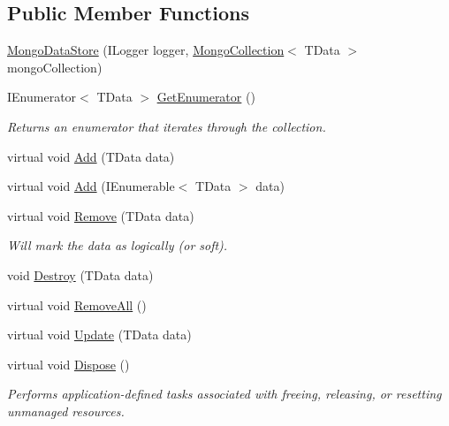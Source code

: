 \subsection*{Public Member Functions}
\begin{DoxyCompactItemize}
\item 
\hyperlink{classCqrs_1_1Mongo_1_1DataStores_1_1MongoDataStore_a39f738d53074a548e6932bacdc4a4e3a}{Mongo\+Data\+Store} (I\+Logger logger, \hyperlink{classCqrs_1_1Mongo_1_1DataStores_1_1MongoDataStore_aa183a8ce44ec16d755f1e4fbe5ec4b10}{Mongo\+Collection}$<$ T\+Data $>$ mongo\+Collection)
\item 
I\+Enumerator$<$ T\+Data $>$ \hyperlink{classCqrs_1_1Mongo_1_1DataStores_1_1MongoDataStore_a3eeaf3e59a540025ff2aa0f62b5dd465}{Get\+Enumerator} ()
\begin{DoxyCompactList}\small\item\em Returns an enumerator that iterates through the collection. \end{DoxyCompactList}\item 
virtual void \hyperlink{classCqrs_1_1Mongo_1_1DataStores_1_1MongoDataStore_a27bcfb40fe8203e09d320b2aa19fff3a}{Add} (T\+Data data)
\item 
virtual void \hyperlink{classCqrs_1_1Mongo_1_1DataStores_1_1MongoDataStore_a38c242b255dc17cf8d19470fdf5a99bf}{Add} (I\+Enumerable$<$ T\+Data $>$ data)
\item 
virtual void \hyperlink{classCqrs_1_1Mongo_1_1DataStores_1_1MongoDataStore_a64003d01de3ac6ffd0e41bb7f572bf96}{Remove} (T\+Data data)
\begin{DoxyCompactList}\small\item\em Will mark the {\itshape data}  as logically (or soft). \end{DoxyCompactList}\item 
void \hyperlink{classCqrs_1_1Mongo_1_1DataStores_1_1MongoDataStore_af97319aef1f0484666d9ea12578b8df9}{Destroy} (T\+Data data)
\item 
virtual void \hyperlink{classCqrs_1_1Mongo_1_1DataStores_1_1MongoDataStore_a878966ea796321cae54c3c619e3178d5}{Remove\+All} ()
\item 
virtual void \hyperlink{classCqrs_1_1Mongo_1_1DataStores_1_1MongoDataStore_a03aac0495445d34f124db893cd09cbd8}{Update} (T\+Data data)
\item 
virtual void \hyperlink{classCqrs_1_1Mongo_1_1DataStores_1_1MongoDataStore_a4af729196a5fa4962961c9ce38b74891}{Dispose} ()
\begin{DoxyCompactList}\small\item\em Performs application-\/defined tasks associated with freeing, releasing, or resetting unmanaged resources. \end{DoxyCompactList}\end{DoxyCompactItemize}
